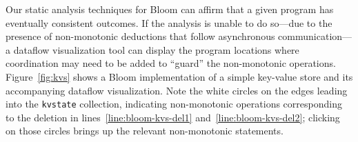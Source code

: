 
Our static analysis techniques for Bloom can
affirm that a given program has eventually consistent outcomes.
If the analysis is unable to do so---due to the presence of non-monotonic deductions
that follow asynchronous communication---a dataflow visualization tool can display the
program locations where coordination may need to be added to ``guard'' the
non-monotonic operations.  
Figure~\ref{fig:kvs} shows a Bloom implementation of a simple key-value store
and its accompanying dataflow visualization.  Note the white circles on the edges leading
into the \texttt{kvstate} collection, indicating non-monotonic operations corresponding to 
the deletion in lines~\ref{line:bloom-kvs-del1} and~\ref{line:bloom-kvs-del2}; clicking on those circles brings up the relevant non-monotonic statements.


